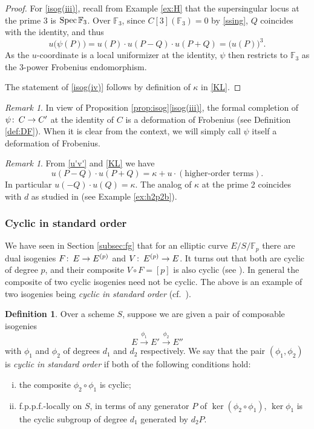 \documentclass{gtpart}
\theoremstyle{definition}
\newtheorem{defn}[thm]{Definition}
\theoremstyle{remark}
\newtheorem{rmk}[thm]{Remark}
\def\co{\colon\thinspace}
\newcommand{\mb}[1]{\mathbb{#1}}
\newcommand{\Spec}{{\rm Spec\thinspace}}
\newcommand{\BF}{{\mb F}}
\newcommand{\K}{\kappa}
\newcommand{\isog}[1]{Proposition \ref{prop:isog}\thinspace \eqref{isog(#1)}}
\numberwithin{equation}{section}
\numberwithin{thm}{section}
\begin{document}
\begin{proof}
 For \eqref{isog(iii)}, recall from Example \ref{ex:H} that the 
 supersingular locus at the prime 3 is $\Spec \BF_3$.  Over $\BF_3$, 
 since $C[3](\BF_3) = 0$ by \eqref{ssing}, $Q$ coincides with the 
 identity, and thus 
 \[
  u\big( \psi(P) \big) = u(P) \cdot u(P-Q) \cdot u(P+Q) 
  = \big( u(P) \big)^3.  
 \]
 As the $u$-coordinate is a local uniformizer at the identity, $\psi$ 
 then restricts to $\BF_3$ as the 3-power Frobenius endomorphism.  

 The statement of \eqref{isog(iv)} follows by definition of $\K$ in 
 \eqref{KL}.  
\end{proof}

\begin{rmk}
\label{rmk:DF}
 In view of \isog{iii}, the formal completion of $\psi \co C \to C'$ at 
 the identity of $C$ is a deformation of Frobenius (see Definition 
 \ref{def:DF}).  When it is clear from the context, we will simply call 
 $\psi$ itself a deformation of Frobenius.  
\end{rmk}

\begin{rmk}
\label{rmk:K}
 From \eqref{u'v'} and \eqref{KL} we have 
 \begin{equation}
 \label{norm}
  u(P-Q) \cdot u(P+Q) = \K + u \cdot (\text{higher-order terms}).  
 \end{equation}
 In particular $u(-Q) \cdot u(Q) = \K$.  The analog of $\K$ at the prime 
 2 coincides with $d$ as studied in \cite[Section 3]{h2p2} (see Example 
 \ref{ex:h2p2b}).  
\end{rmk}

\subsubsection*{Cyclic in standard order}

We have seen in Section \ref{subsec:fg} that for an elliptic curve 
$E/S/\BF_p$ there are dual isogenies $F \co E \to E^{(p)}$ and 
$V \co E^{(p)} \to E$.  It turns out that both are cyclic of degree $p$, 
and their composite $V \circ F = [p]$ is also cyclic (see 
\cite[12.2.1, 12.2.3, and 12.2.5]{KM}).  In general the composite of two 
cyclic isogenies need not be cyclic.  The above is an example of two 
isogenies being {\em cyclic in standard order} (cf.~\cite[6.7.7]{KM}).  

\begin{defn}
\label{def:cso}
 Over a scheme $S$, suppose we are given a pair of composable isogenies 
 \[
  E \xrightarrow{\phi_1} E' \xrightarrow{\phi_2} E'' 
 \]
 with $\phi_1$ and $\phi_2$ of degrees $d_1$ and $d_2$ respectively.  We 
 say that the pair $(\phi_1,\phi_2)$ is {\em cyclic in standard order} 
 if both of the following conditions hold: 
 \begin{enumerate}[(i)]
  \item the composite $\phi_2 \circ \phi_1$ is cyclic; 

  \item f.p.p.f.-locally on $S$, in terms of any generator $P$ of 
  $\ker(\phi_2 \circ \phi_1)$, $\ker \phi_1$ is the cyclic subgroup of 
  degree $d_1$ generated by $d_2 P$.  
 \end{enumerate}
\end{defn}
\end{document}
